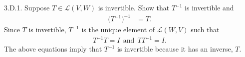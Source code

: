 \documentclass[a5paper]{article}
\begin{document}
\newcommand   \C           {\mathbf{C}}
\newcommand   \R           {\mathbf{R}}
\renewcommand \L           {\mathcal{L}}
\newcommand   \F           {\mathbf{F}}
\renewcommand \P           {\mathcal{P}}
\newcommand   \M           {\mathcal{M}}
\newcommand   \op          {\operatorname}


    3.D.1.
    Suppose $T \in \L(V,W)$ is invertible.
    Show that $T^{-1}$ is invertible and
\begin{align*}
        \big(T^{-1}\big)^{-1} &= T .
\end{align*}
    Since $T$ is invertible, $T^{-1}$ is the unique element of $\L(W,V)$ such that
\begin{align*}
        T^{-1} T = I \ \ \text{and}\ \ T T^{-1} = I .
\end{align*}
    The above equations imply that $T^{-1}$ is invertible because it has an inverse, $T$.
\end{document}
